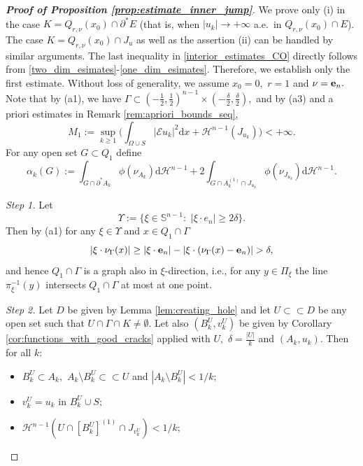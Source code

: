 \documentclass[reqno]{amsart}
\numberwithin{equation}{section}
\theoremstyle{plain}
\theoremstyle{definition}
\renewcommand{\S}{\mathbb{S}}
\newcommand{\cH}{\mathcal{H}}
\newcommand{\p}{\partial}
\renewcommand{\d}{\mathrm{d}}
\newcommand{\e}{{\bf e}}
\newcommand{\strictlyincluded}{\subset\subset}
\newcommand{\str}[1]{\mathcal{E}#1}
\begin{document}
 
\begin{proof}[\textbf{Proof of Proposition \ref{prop:estimate_inner_jump}}]
We prove only (i) in the case $K=Q_{r,\nu}(x_0)\cap \p^*E$ (that is, when $|u_k|\to +\infty$ a.e.\  in $Q_{r,\nu}(x_0)\cap E$). The case $K=Q_{r,\nu}(x_0)\cap J_u$ as well as the assertion (ii) can be handled by similar arguments.
The last inequality in \eqref{interior_estimates_CO} directly follows from \eqref{two_dim_esimates}-\eqref{one_dim_esimates}.
Therefore, we establish only the first estimate.
Without loss of generality, we assume $x_0=0,$ $r=1$ and $\nu=\e_n.$
Note that by (a1),  we have $\Gamma\subset (-\frac12,\frac12)^{n-1}\times(-\frac{\delta}{2},\frac{\delta}{2}),$ and
by (a3) and a priori estimates in Remark \ref{rem:apriori_bounds_seq},
\begin{equation}\label{ebergy_bounded_uni_qaraya00}
M_1:=\sup\limits_{k\ge1}\Big(\int_{\Omega\cup S}|\str{u_k}|^2\d x + 
\cH^{n-1}(J_{u_k})\Big)<+\infty.  
\end{equation}
For any open set $G\subset Q_1$ define
$$
\alpha_k(G):=\int_{G\cap\p^*A_k} \phi(\nu_{A_k})\d\cH^{n-1} + 2\int_{G\cap A_k^{(1)} \cap J_{u_k}} \phi(\nu_{J_{u_k}})\d\cH^{n-1}.
$$

{\it Step 1.} Let 
$$
\Upsilon:=\{\xi\in\S^{n-1}:\,\, |\xi\cdot e_n| \ge 2\delta \}.
$$
Then by (a1) for any $\xi\in\Upsilon$ and $x\in Q_1\cap\Gamma$
$$
|\xi \cdot \nu_\Gamma(x)| \ge |\xi \cdot \e_n| -|\xi\cdot (\nu_\Gamma(x) - \e_n)| >\delta ,
$$
and hence $Q_1\cap \Gamma$ is a graph also in $\xi$-direction, i.e., for any $y\in\Pi_\xi$ the line $\pi_\xi^{-1}(y)$ intersects $Q_1\cap \Gamma$ at most at one point.



{\it Step 2.} Let $D$ be given by Lemma \ref{lem:creating_hole} and let $U\strictlyincluded D$ be any open set such that $U\cap \Gamma\cap K\ne\emptyset.$ 
Let also $(B_k^U,v_k^U)$ be given by Corollary \ref{cor:functions_with_good_cracks} applied with $U,$ $\delta  =\frac{|U|}{k}$ and $(A_k,u_k)$. 
Then for all $k:$
\begin{itemize}
 \item[($\rm a_1$)] $B_k^U\subset A_k,$ $A_k\setminus B_k^U\strictlyincluded U$ and $|A_k\setminus B_k^U| <1/k;$
 
 \item[($\rm a_2$)] $v_k^U = u_k$ in $B_k^U\cup S;$
 
 \item[($\rm a_3$)] $\cH^{n-1}(U\cap [B_k^U]^{(1)}\cap J_{v_k^U})<1/k;$
 

\end{itemize}
\end{proof}
\end{document}
